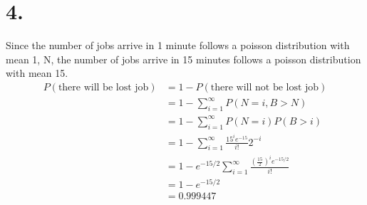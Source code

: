 \documentclass[11pt]{article}
\begin{document}
\section*{4.}
Since the number of jobs arrive in 1 minute follows a poisson distribution with mean 1,
N, the number of jobs arrive in 15 minutes follows a poisson distribution with mean 15.
\begin{equation*}
    \begin{aligned}
        P(\text{there will be lost job}) &= 1 - P(\text{there will not be lost job}) \\
        &= 1 - \sum_{i=1}^\infty P(N = i, B > N) \\
        &= 1 - \sum_{i=1}^\infty P(N=i)P(B>i) \\
        &= 1 - \sum_{i=1}^\infty \frac{15^i e^{-15}}{i!} 2^{-i} \\
        &= 1 - e^{-15/2} \sum_{i=1}^\infty \frac{\left(\frac{15}{2}\right)^i e^{-15/2}}{i!} \\
        &= 1 - e^{-15/2} \\
        &= 0.999447
    \end{aligned}
\end{equation*}
\end{document}
